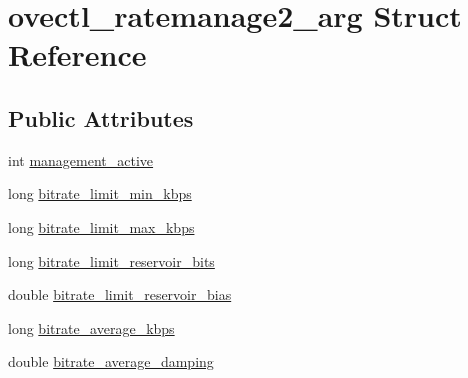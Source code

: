 \hypertarget{structovectl__ratemanage2__arg}{\section{ovectl\+\_\+ratemanage2\+\_\+arg Struct Reference}
\label{structovectl__ratemanage2__arg}
}
\subsection*{Public Attributes}
\begin{DoxyCompactItemize}
\item 
int \hyperlink{structovectl__ratemanage2__arg_aca1f656373a1597177dac924578e375b}{management\+\_\+active}
\item 
long \hyperlink{structovectl__ratemanage2__arg_aeb53a17fff14ec50d143602adfdeabeb}{bitrate\+\_\+limit\+\_\+min\+\_\+kbps}
\item 
long \hyperlink{structovectl__ratemanage2__arg_a175691482003edd7d94592fa2bc993a9}{bitrate\+\_\+limit\+\_\+max\+\_\+kbps}
\item 
long \hyperlink{structovectl__ratemanage2__arg_a75e496acac882e156137de9d1200ebd7}{bitrate\+\_\+limit\+\_\+reservoir\+\_\+bits}
\item 
double \hyperlink{structovectl__ratemanage2__arg_a5567fde1798b1e80e40a77565b4b44f4}{bitrate\+\_\+limit\+\_\+reservoir\+\_\+bias}
\item 
long \hyperlink{structovectl__ratemanage2__arg_a1f6bab60d87143d5060dd6c59aad6e71}{bitrate\+\_\+average\+\_\+kbps}
\item 
double \hyperlink{structovectl__ratemanage2__arg_a1069e148a884d8706928cd2e39870720}{bitrate\+\_\+average\+\_\+damping}
\end{DoxyCompactItemize}


